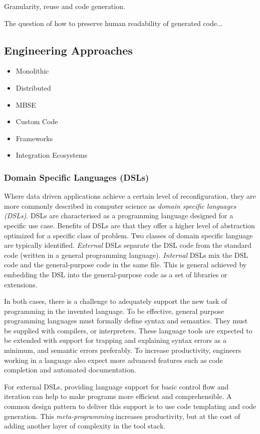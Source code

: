 \documentclass[5p]{elsarticle}
\begin{document}
Granularity, reuse and code generation.

The question of how to preserve human readability of generated code...

\subsection{Engineering Approaches}

\begin{itemize}
\item{Monolithic}
\item{Distributed}
\item{MBSE}
\item{Custom Code}
\item{Frameworks}
\item{Integration Ecosystems}
\end{itemize}

\subsubsection{Domain Specific Languages (DSLs)}

Where data driven applications achieve a certain level of reconfiguration, they are more commonly
described in computer science as {\em domain specific languages (DSLs)}. DSLs are characterised
as a programming language designed for a specific use case.  Benefits of DSLs are that they 
offer a higher level of abstraction optimized for a specific class of problem. Two classes
of domain specific language are typically identified. {\em External} DSLs separate the DSL
code from the standard code (written in a general programming language).  {\em Internal} DSLs
mix the DSL code and the general-purpose code in the same file.  This is general achieved by
embedding the DSL into the general-purpose code as a set of libraries or extensions.

In both cases, there is a challenge to adequately support the new task of programming
in the invented language.  To be effective, general purpose programming languages must
formally define syntax and semantics. They must be supplied with compilers, or interpreters.
These language tools are expected to be extended with support for trapping and explaining
syntax errors as a minimum, and semantic errors preferably.  To increase productivity, 
engineers working in a language also expect more advanced features such as code completion
and automated documentation.

For external DSLs, providing language support for basic control flow and iteration
can help to make programs more efficient and comprehensible.  A common design pattern
to deliver this support is to use code templating and code generation.  This
{\em meta-programming} increases productivity, but at the cost of adding another
layer of complexity in the tool stack.
\end{document}
